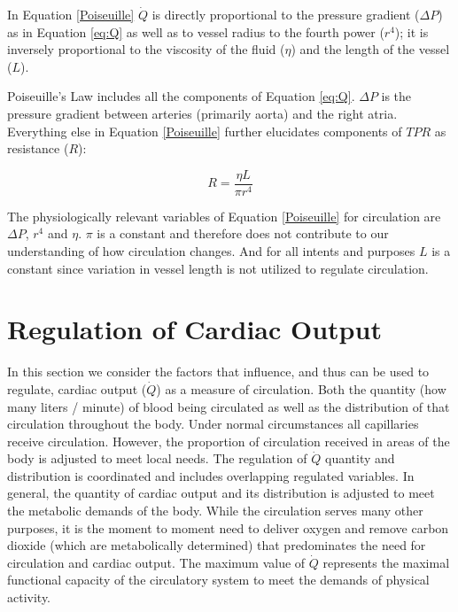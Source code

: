 In Equation \ref{Poiseuille} $\dot{Q}$ is directly proportional to the pressure gradient ($\Delta P$) as in Equation \ref{eq:Q} as well as to vessel radius to the fourth power ($r^4$); it is inversely proportional to the viscosity of the fluid ($\eta$) and the length of the vessel ($L$). 

Poiseuille's Law includes all the components of Equation \ref{eq:Q}. $\Delta P$ is the pressure gradient between arteries (primarily aorta) and the right atria. Everything else in Equation \ref{Poiseuille} further elucidates components of $TPR$ as resistance ($R$):

\begin{equation}
    R = \frac{\eta L}{\pi r^4}
    \label{resistance}
\end{equation}

The physiologically relevant variables of Equation \ref{Poiseuille} for circulation are $\Delta P$, $r^4$ and $\eta$. $\pi$ is a constant and therefore does not contribute to our understanding of how circulation changes. And for all intents and purposes $L$ is a constant since variation in vessel length is not utilized to regulate circulation.

\section{Regulation of Cardiac Output}

In this section we consider the factors that influence, and thus can be used to regulate, cardiac output ($\dot{Q}$) as a measure of circulation. Both the quantity (how many liters / minute) of blood being circulated as well as the distribution of that circulation throughout the body. Under normal circumstances all capillaries receive circulation. However, the proportion of circulation received in areas of the body is adjusted to meet local needs. The regulation of $\dot{Q}$ quantity and distribution is coordinated and includes overlapping regulated variables. In general, the quantity of cardiac output and its distribution is adjusted to meet the metabolic demands of the body. While the circulation serves many other purposes, it is the moment to moment need to deliver oxygen and remove carbon dioxide (which are metabolically determined) that predominates the need for circulation and cardiac output. The maximum value of $\dot{Q}$ represents the maximal functional capacity of the circulatory system to meet the demands of physical activity.

